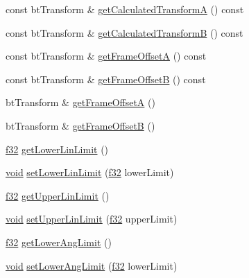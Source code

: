 \begin{DoxyCompactItemize}
const bt\+Transform \& \mbox{\hyperlink{classnjli_1_1_physics_constraint_slider_a861837cb7a6b3da7f3a7402f78220efb}{get\+Calculated\+TransformA}} () const
\item 
const bt\+Transform \& \mbox{\hyperlink{classnjli_1_1_physics_constraint_slider_a9bc7ba57a4bb23927fd1918df223cb4a}{get\+Calculated\+TransformB}} () const
\item 
const bt\+Transform \& \mbox{\hyperlink{classnjli_1_1_physics_constraint_slider_a0ddd008beae3354d3eb6464d26f133bb}{get\+Frame\+OffsetA}} () const
\item 
const bt\+Transform \& \mbox{\hyperlink{classnjli_1_1_physics_constraint_slider_a52fc014051a8e446575a43606e5ea698}{get\+Frame\+OffsetB}} () const
\item 
bt\+Transform \& \mbox{\hyperlink{classnjli_1_1_physics_constraint_slider_a51d8981be28fc9abdd9b044db032280a}{get\+Frame\+OffsetA}} ()
\item 
bt\+Transform \& \mbox{\hyperlink{classnjli_1_1_physics_constraint_slider_a3cca885309223cd47665d81ad45b3705}{get\+Frame\+OffsetB}} ()
\item 
\mbox{\hyperlink{_util_8h_a5f6906312a689f27d70e9d086649d3fd}{f32}} \mbox{\hyperlink{classnjli_1_1_physics_constraint_slider_a2f84890f5c02e1c5ca7caa2c930562b6}{get\+Lower\+Lin\+Limit}} ()
\item 
\mbox{\hyperlink{_thread_8h_af1e856da2e658414cb2456cb6f7ebc66}{void}} \mbox{\hyperlink{classnjli_1_1_physics_constraint_slider_a8ce84b863a5f45630d74285509a5f72e}{set\+Lower\+Lin\+Limit}} (\mbox{\hyperlink{_util_8h_a5f6906312a689f27d70e9d086649d3fd}{f32}} lower\+Limit)
\item 
\mbox{\hyperlink{_util_8h_a5f6906312a689f27d70e9d086649d3fd}{f32}} \mbox{\hyperlink{classnjli_1_1_physics_constraint_slider_ab3f5c8fdee3a5425050e672ce7cd51d6}{get\+Upper\+Lin\+Limit}} ()
\item 
\mbox{\hyperlink{_thread_8h_af1e856da2e658414cb2456cb6f7ebc66}{void}} \mbox{\hyperlink{classnjli_1_1_physics_constraint_slider_a3ff24369c4200448e7854b3b64943656}{set\+Upper\+Lin\+Limit}} (\mbox{\hyperlink{_util_8h_a5f6906312a689f27d70e9d086649d3fd}{f32}} upper\+Limit)
\item 
\mbox{\hyperlink{_util_8h_a5f6906312a689f27d70e9d086649d3fd}{f32}} \mbox{\hyperlink{classnjli_1_1_physics_constraint_slider_a236211fb9108e12d05d70996c77f9b98}{get\+Lower\+Ang\+Limit}} ()
\item 
\mbox{\hyperlink{_thread_8h_af1e856da2e658414cb2456cb6f7ebc66}{void}} \mbox{\hyperlink{classnjli_1_1_physics_constraint_slider_aea8072c63719f2d3be84a02b1cabb9cb}{set\+Lower\+Ang\+Limit}} (\mbox{\hyperlink{_util_8h_a5f6906312a689f27d70e9d086649d3fd}{f32}} lower\+Limit)

\end{DoxyCompactItemize}
